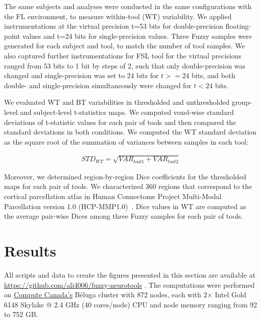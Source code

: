 \documentclass[conference]{IEEEtran}
\begin{document}
The same subjects and analyses were conducted in the same configurations
with the FL environment, to measure within-tool (WT) variability. We
applied instrumentations at the virtual precision t=53 bits for
double-precision floating-point values and t=24 bits for single-precision
values. Three Fuzzy samples were generated for each subject and tool, to
match the number of tool samples.
We also captured further instrumentations for FSL tool for the virtual precisions ranged from 53 bits to 1 bit by steps of 2,
such that only double-precision was changed and single-precision was set to 24 bits for $t >= 24$ bits,
and both double- and single-precision simultaneously were changed for $t < 24$ bits.

We evaluated WT and BT variabilities in thresholded and unthresholded group-level and subject-level t-statistics maps.
We computed voxel-wise standard deviations of t-statistic values for each pair of tools
and then compared the standard deviations in both conditions.
We computed the WT standard deviation as the square root of the summation of variances between samples in each tool:

\begin{equation} \label{eq:mca_std}
  \begin{multlined}
  STD_{WT} = \sqrt{VAR_{tool1} + VAR_{tool2}}
  \end{multlined}
\end{equation}

Moreover, we determined region-by-region Dice coefficients for the thresholded maps for each pair of tools.
We characterized 360 regions that correspond to the cortical parcellation atlas
in Human Connectome Project Multi-Modal Parcellation version 1.0 (HCP-MMP1.0)~\cite{glasser2016multi}.
Dice values in WT are computed as the average pair-wise Dices among three Fuzzy samples for each pair of tools.


\section{Results}
All scripts and data to create the figures presented in this section are available at \url{https://github.com/ali4006/fuzzy-neurotools} .
The computations were performed on \href{https://www.computecanada.ca}{Compute Canada's} Béluga cluster
with 872 nodes, each with 2× Intel Gold 6148 Skylake @ 2.4 GHz (40 cores/node) CPU and node memory ranging from 92 to 752 GB.
\end{document}
